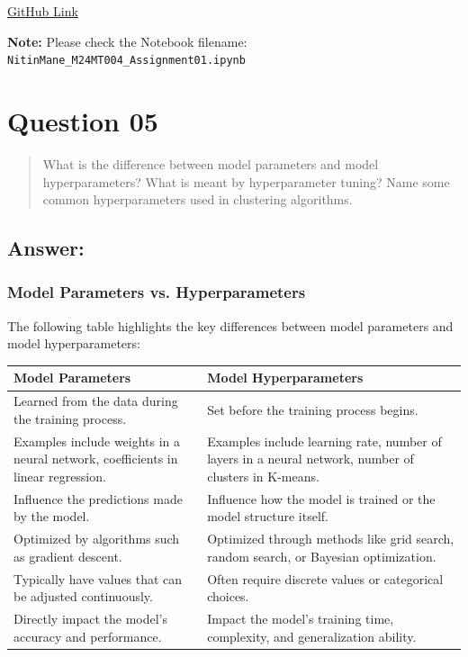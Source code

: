 \documentclass{exam}
\begin{document}
\href{https://github.com/Nitin-Mane/CS550-Machine-Learning-Assignment/tree/main/Assignment_03}{GitHub Link}

\textbf{Note:} Please check the Notebook filename: \texttt{NitinMane\_M24MT004\_Assignment01.ipynb}

\section{Question 05}

\begin{quote}
What is the difference between model parameters and model hyperparameters? What is meant by hyperparameter tuning? Name some common hyperparameters used in clustering algorithms.
\end{quote}

\subsection{Answer:}

\subsubsection{Model Parameters vs. Hyperparameters}

The following table highlights the key differences between model parameters and model hyperparameters:

\begin{center}
\begin{tabular}{|p{7cm}|p{7cm}|}
\hline
\textbf{Model Parameters} & \textbf{Model Hyperparameters} \\
\hline
Learned from the data during the training process. & Set before the training process begins. \\
\hline
Examples include weights in a neural network, coefficients in linear regression. & Examples include learning rate, number of layers in a neural network, number of clusters in K-means. \\
\hline
Influence the predictions made by the model. & Influence how the model is trained or the model structure itself. \\
\hline
Optimized by algorithms such as gradient descent. & Optimized through methods like grid search, random search, or Bayesian optimization. \\
\hline
Typically have values that can be adjusted continuously. & Often require discrete values or categorical choices. \\
\hline
Directly impact the model's accuracy and performance. & Impact the model's training time, complexity, and generalization ability. \\
\hline
\end{tabular}
\end{center}
\end{document}
